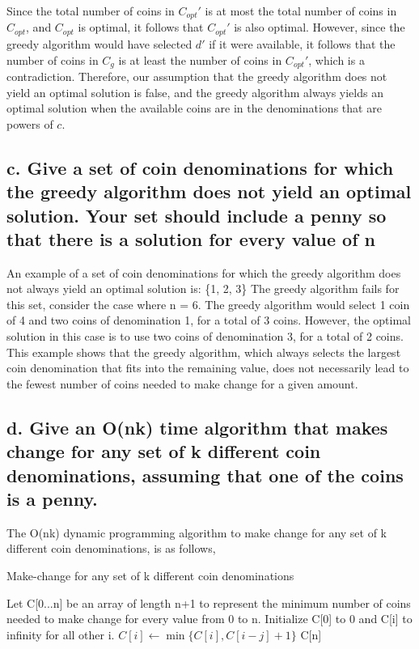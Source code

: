 \documentclass[fleqn,10pt]{olplainarticle}
\begin{document}
Since the total number of coins in $C_{opt}'$ is at most the total number of coins in $C_{opt}$, and $C_{opt}$ is optimal, it follows that $C_{opt}'$ is also optimal. However, since the greedy algorithm would have selected $d'$ if it were available, it follows that the number of coins in $C_g$ is at least the number of coins in $C_{opt}'$, which is a contradiction.
Therefore, our assumption that the greedy algorithm does not yield an optimal solution is false, and the greedy algorithm always yields an optimal solution when the available coins are in the denominations that are powers of $c$.


\subsection*{c. Give a set of coin denominations for which the greedy algorithm does not yield an optimal solution. Your set should include a penny so that there is a solution for every value of n\newline }

An example of a set of coin denominations for which the greedy algorithm does not always yield an optimal solution is: 
\newline\{1, 2, 3\}
\newline The greedy algorithm fails for this set, consider the case where n = 6. The greedy algorithm would select 1 coin of 4 and two coins of denomination 1, for a total of 3 coins. However, the optimal solution in this case is to use two coins of denomination 3, for a total of 2 coins.
This example shows that the greedy algorithm, which always selects the largest coin denomination that fits into the remaining value, does not necessarily lead to the fewest number of coins needed to make change for a given amount.

\subsection*{d. Give an O(nk) time algorithm that makes change for any set of k different coin denominations, assuming that one of the coins is a penny.\newline }

The O(nk) dynamic programming algorithm to make change for any set of k different coin denominations, is as follows,



\begin{algorithm}
    \caption{Make-change for any set of k different coin denominations}
    \begin{algorithmic}[1]
        \State Let C[0...n] be an array of length n+1 to represent the minimum number of coins needed to make change for every value from 0 to n. Initialize C[0] to 0 and C[i] to infinity for all other i.
                \State $C[i] \gets \min\{C[i], C[i-j]+1\}$
            \EndFor
        \EndFor
        \State \Return C[n] 
    \end{algorithmic}
\end{algorithm}
\end{document}

